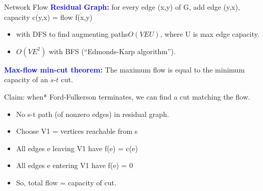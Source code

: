 \documentclass[10pt,a4paper]{article}
\begin{document}
\begin{multicols}{3}
\begin{textbox}{Network Flow}
    \textcolor{blue}{{\bf Residual Graph:}}  for every edge (x,y) of G, add edge (y,x), capacity c(y,x) = flow f(x,y)

    \begin{itemize}
        \item with DFS to find augmenting paths$O(VEU)$, where U is max edge capacity.
        \item $O(VE^2)$ with BFS (“Edmonds-Karp algorithm”).
    \end{itemize}
    
    \textcolor{blue}{{\bf Max-flow min-cut theorem:}} The maximum flow is equal to the minimum capacity of an $s$-$t$ cut.
    
    \smallskip
    Claim: when* Ford-Fulkerson terminates, we can find a cut matching the flow.
    \begin{itemize}
        \item No s-t path (of nonzero edges) in residual graph.
        \item Choose V1 = {vertices reachable from s}
        \item All edges e leaving V1 have f(e) = c(e)
        \item All edges e entering V1 have f(e) = 0
        \item So, total flow = capacity of cut.
    \end{itemize}

\end{textbox}

\end{multicols}
\end{document}
